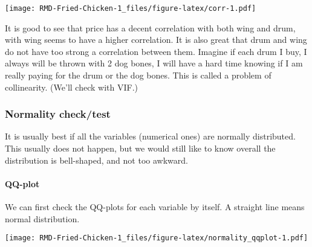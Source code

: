 \documentclass[
]{article}
\newenvironment{Shaded}{\begin{snugshade}}{\end{snugshade}}
\newcommand{\AttributeTok}[1]{\textcolor[rgb]{0.77,0.63,0.00}{#1}}
\newcommand{\FunctionTok}[1]{\textcolor[rgb]{0.00,0.00,0.00}{#1}}
\newcommand{\NormalTok}[1]{#1}
\newcommand{\SpecialCharTok}[1]{\textcolor[rgb]{0.00,0.00,0.00}{#1}}
\newcommand{\StringTok}[1]{\textcolor[rgb]{0.31,0.60,0.02}{#1}}
\begin{document}
\texttt{[image: RMD-Fried-Chicken-1\_files/figure-latex/corr-1.pdf]}

It is good to see that price has a decent correlation with both wing and
drum, with wing seems to have a higher correlation. It is also great
that drum and wing do not have too strong a correlation between them.
Imagine if each drum I buy, I always will be thrown with 2 dog bones, I
will have a hard time knowing if I am really paying for the drum or the
dog bones. This is called a problem of collinearity. (We'll check with
VIF.)

\hypertarget{normality-checktest}{%
\subsubsection{Normality check/test}\label{normality-checktest}}

It is usually best if all the variables (numerical ones) are normally
distributed. This usually does not happen, but we would still like to
know overall the distribution is bell-shaped, and not too awkward.

\hypertarget{qq-plot}{%
\paragraph{QQ-plot}\label{qq-plot}}

We can first check the QQ-plots for each variable by itself. A straight
line means normal distribution.

\begin{Shaded}
\end{Shaded}

\texttt{[image: RMD-Fried-Chicken-1\_files/figure-latex/normality\_qqplot-1.pdf]}

\begin{Shaded}
\end{Shaded}
\end{document}
